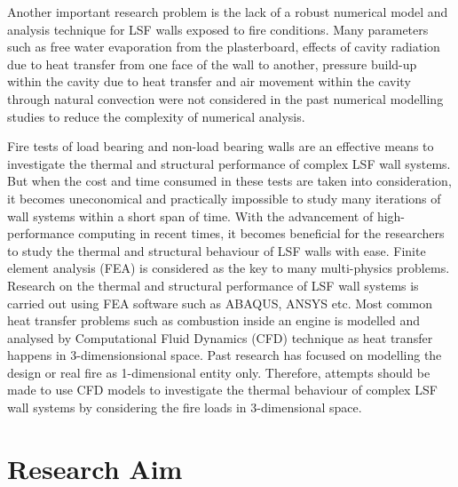 Another important research problem is the lack of a robust numerical model and analysis technique for LSF walls exposed to fire conditions. Many parameters such as free water evaporation from the plasterboard, effects of cavity radiation due to heat transfer from one face of the wall to another, pressure build-up within the cavity due to heat transfer and air movement within the cavity through natural convection were not considered in the past numerical modelling studies to reduce the complexity of numerical analysis. 

Fire tests of load bearing and non-load bearing walls are an effective means to investigate the thermal and structural performance of complex LSF wall systems. But when the cost and time consumed in these tests are taken into consideration, it becomes uneconomical and practically impossible to study many iterations of wall systems within a short span of time. With the advancement of high-performance computing in recent times, it becomes beneficial for the researchers to study the thermal and structural behaviour of LSF walls with ease. Finite element analysis (FEA) is considered as the key to many multi-physics problems. Research on the thermal and structural performance of LSF wall systems is carried out using FEA software such as ABAQUS, ANSYS etc. Most common heat transfer problems such as combustion inside an engine is modelled and analysed by Computational Fluid Dynamics (CFD) technique as heat transfer happens in 3-dimensionsional space. Past research has focused on modelling the design or real fire as 1-dimensional entity only. Therefore, attempts should be made to use CFD models to investigate the thermal behaviour of complex LSF wall systems by considering the fire loads in 3-dimensional space.

\section{Research Aim}\label{sec:research-aim}

